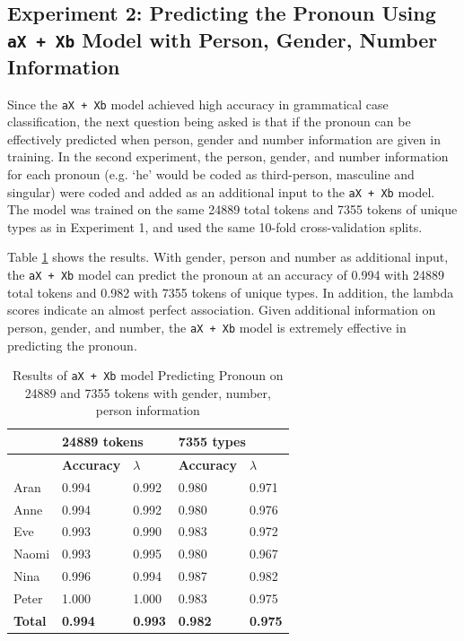 \subsection{Experiment 2: Predicting the Pronoun Using \texttt{aX + Xb} Model with Person, Gender, Number Information}
\label{sec:Experiment2}

Since the \texttt{aX + Xb} model achieved high accuracy in grammatical case classification, the next question being asked is that if the pronoun can be effectively predicted when person, gender and number information are given in training. In the second experiment, the person, gender, and number information for each pronoun (e.g. `he' would be coded as third-person, masculine and singular) were coded and added as an additional input to the \texttt{aX + Xb} model. The model was trained on the same 24889 total tokens and 7355 tokens of unique types as in Experiment 1, and used the same 10-fold cross-validation splits. 

Table \ref{tablepp:4} shows the results. With gender, person and number as additional input, the \texttt{aX + Xb} model can predict the pronoun at an accuracy of 0.994 with 24889 total tokens and 0.982 with 7355 tokens of unique types. In addition, the lambda scores indicate an almost perfect association. Given additional information on person, gender, and number, the \texttt{aX + Xb} model is extremely effective in predicting the pronoun. 

\FloatBarrier
\begin{table}[!h]
\centering
\caption{Results of \texttt{aX + Xb} model Predicting Pronoun on 24889 and 7355 tokens with gender, number, person information }
\label{tablepp:4}
\begin{tabular}{lllll}
\toprule
 & \multicolumn{2}{l}{\textbf{24889 tokens}} & \multicolumn{2}{l}{\textbf{7355 types}} \\ \hline
 & \textbf{Accuracy} & \textbf{$\lambda$} & \textbf{Accuracy} & \textbf{$\lambda$} \\ \hline
Aran & 0.994 & 0.992 & 0.980 & 0.971 \\
Anne & 0.994 & 0.992 & 0.980 & 0.976 \\
Eve & 0.993 & 0.990 & 0.983 & 0.972 \\
Naomi & 0.993 & 0.995 & 0.980 & 0.967 \\
Nina & 0.996 & 0.994 & 0.987 & 0.982 \\
Peter & 1.000 & 1.000 & 0.983 & 0.975 \\
\textbf{Total} & \textbf{0.994} & \textbf{0.993} & \textbf{0.982} & \textbf{0.975} \\ \toprule
\end{tabular}
\end{table}
\FloatBarrier


